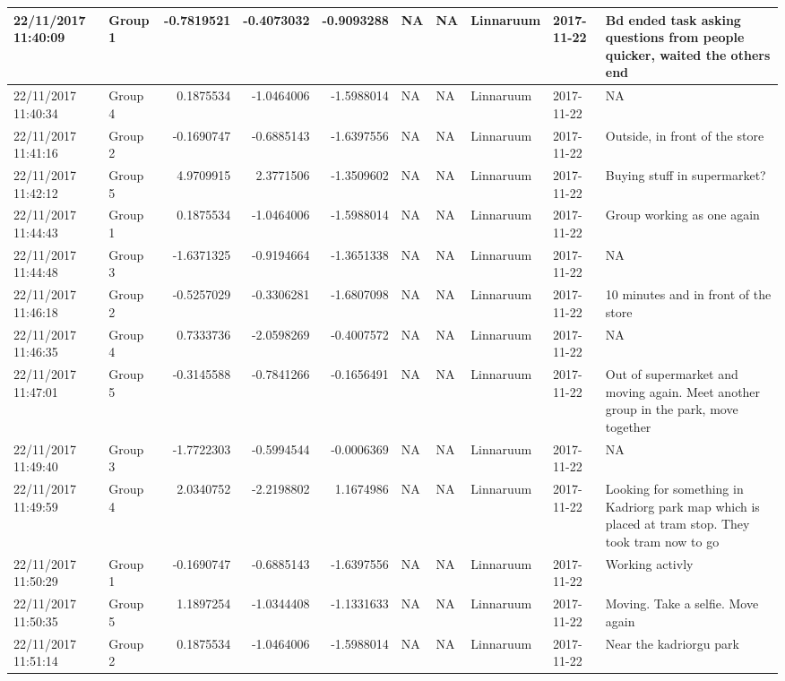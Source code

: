 \documentclass[]{article}
\begin{document}
\begin{tabular}{l|l|r|r|r|l|l|l|l|l}
\hline
22/11/2017 11:40:09 & Group 1 & -0.7819521 & -0.4073032 & -0.9093288 & NA & NA & Linnaruum & 2017-11-22 & Bd ended task asking questions from people quicker, waited the others end\\
\hline
22/11/2017 11:40:34 & Group 4 & 0.1875534 & -1.0464006 & -1.5988014 & NA & NA & Linnaruum & 2017-11-22 & NA\\
\hline
22/11/2017 11:41:16 & Group 2 & -0.1690747 & -0.6885143 & -1.6397556 & NA & NA & Linnaruum & 2017-11-22 & Outside, in front of the store\\
\hline
22/11/2017 11:42:12 & Group 5 & 4.9709915 & 2.3771506 & -1.3509602 & NA & NA & Linnaruum & 2017-11-22 & Buying stuff in supermarket?\\
\hline
22/11/2017 11:44:43 & Group 1 & 0.1875534 & -1.0464006 & -1.5988014 & NA & NA & Linnaruum & 2017-11-22 & Group working as one again\\
\hline
22/11/2017 11:44:48 & Group 3 & -1.6371325 & -0.9194664 & -1.3651338 & NA & NA & Linnaruum & 2017-11-22 & NA\\
\hline
22/11/2017 11:46:18 & Group 2 & -0.5257029 & -0.3306281 & -1.6807098 & NA & NA & Linnaruum & 2017-11-22 & 10 minutes and in front of the store\\
\hline
22/11/2017 11:46:35 & Group 4 & 0.7333736 & -2.0598269 & -0.4007572 & NA & NA & Linnaruum & 2017-11-22 & NA\\
\hline
22/11/2017 11:47:01 & Group 5 & -0.3145588 & -0.7841266 & -0.1656491 & NA & NA & Linnaruum & 2017-11-22 & Out of supermarket and moving again. Meet another group in the park, move together\\
\hline
22/11/2017 11:49:40 & Group 3 & -1.7722303 & -0.5994544 & -0.0006369 & NA & NA & Linnaruum & 2017-11-22 & NA\\
\hline
22/11/2017 11:49:59 & Group 4 & 2.0340752 & -2.2198802 & 1.1674986 & NA & NA & Linnaruum & 2017-11-22 & Looking for something in Kadriorg park map which is placed at tram stop. They took tram now to go\\
\hline
22/11/2017 11:50:29 & Group 1 & -0.1690747 & -0.6885143 & -1.6397556 & NA & NA & Linnaruum & 2017-11-22 & Working activly\\
\hline
22/11/2017 11:50:35 & Group 5 & 1.1897254 & -1.0344408 & -1.1331633 & NA & NA & Linnaruum & 2017-11-22 & Moving. Take a selfie. Move again\\
\hline
22/11/2017 11:51:14 & Group 2 & 0.1875534 & -1.0464006 & -1.5988014 & NA & NA & Linnaruum & 2017-11-22 & Near the kadriorgu park\\

\end{tabular}
\end{document}
